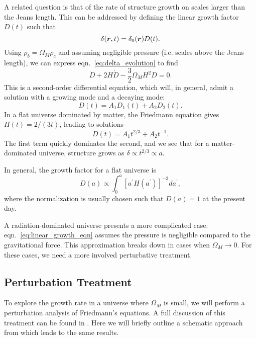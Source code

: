 A related question is that of the rate of structure growth
on scales larger than the Jeans length. 
This can be addressed by defining the linear growth
factor $D(t)$ such that
\begin{equation}
  \label{eq:linear_growth_def}
  \delta(\boldsymbol{r}, t) = \delta_0(\boldsymbol{r})D(t).
\end{equation}
Using $\rho_b = \Omega_M\rho_c$ and assuming negligible pressure (i.e. scales
above the Jeans length), we can express eqn.~\ref{eq:delta_evolution} to find
\begin{equation}
  \label{eq:linear_growth_eqn}
  \ddot{D} + 2H\dot{D} - \frac{3}{2}\Omega_M H^2D = 0.
\end{equation}
This is a second-order differential equation, which will, in general,
admit a solution with a growing mode and a decaying mode:
\begin{equation}
  D(t) = A_1 D_1(t) + A_2 D_2(t).
\end{equation}
In a flat universe dominated by matter, the
Friedmann equation gives $H(t) = 2 / (3t)$, leading to solutions
\begin{equation}
  D(t) = A_1 t^{2/3} + A_2 t^{-1}.
\end{equation}
The first term quickly dominates the second, and we see that for a
matter-dominated universe, structure grows as
$\delta \propto t^{2/3} \propto a$.

In general, the growth factor for a flat universe is
\begin{equation}
  \label{eq:linear_growth}
  D(a) \propto \int_0^a [a^\prime H(a^\prime)]^{-3}da^\prime,
\end{equation}
where the normalization is usually chosen such that $D(a) = 1$ at the
present day.

A radiation-dominated universe presents a more complicated case:
eqn.~\ref{eq:linear_growth_eqn} assumes the pressure is negligible compared
to the gravitational force.  This approximation breaks down in
cases when $\Omega_M \to 0$.  For these cases, we need a more involved
perturbative treatment.

\subsection{Perturbation Treatment}
To explore the growth rate in a universe where $\Omega_M$ is small, we
will perform a perturbation analysis of Friedmann's equations.
A full discussion of this treatment can be found in
\citet{peebles1993principles}.
Here we will briefly outline a schematic approach from \citet{kolb_turner}
which leads to the same results.

